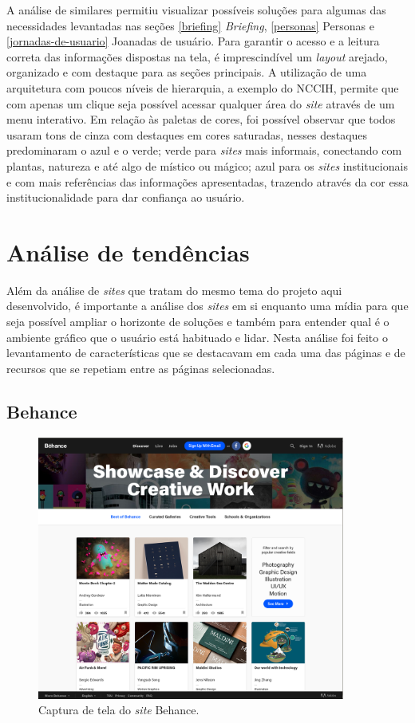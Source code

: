 A análise de similares permitiu visualizar possíveis soluções para algumas das necessidades levantadas nas seções \ref{briefing} \emph{Briefing}, \ref{personas} Personas e \ref{jornadas-de-usuario} Joanadas de usuário. Para garantir o acesso e a leitura correta das informações dispostas na tela, é imprescindível um \emph{layout} arejado, organizado e com destaque para as seções principais. A utilização de uma arquitetura com poucos níveis de hierarquia, a exemplo do NCCIH, permite que com apenas um clique seja possível acessar qualquer área do \emph{site} através de um menu interativo. Em relação às paletas de cores, foi possível observar que todos usaram tons de cinza com destaques em cores saturadas, nesses destaques predominaram o azul e o verde; verde para \emph{sites} mais informais, conectando com plantas, natureza e até algo de místico ou mágico; azul para os \emph{sites} institucionais e com mais referências das informações apresentadas, trazendo através da cor essa institucionalidade para dar confiança ao usuário.

\section{Análise de tendências}\label{analise-de-tendencias}

Além da análise de \emph{sites} que tratam do mesmo tema do projeto aqui desenvolvido, é importante a análise dos \emph{sites} em si enquanto uma mídia para que seja possível ampliar o horizonte de soluções e também para entender qual é o ambiente gráfico que o usuário está habituado e lidar. Nesta análise foi feito o levantamento de características que se destacavam em cada uma das páginas e de recursos que se repetiam entre as páginas selecionadas.

\subsection{Behance}\label{behance}

\begin{figure}[!htbp]
\centering
\caption{\label{fig-behance}Captura de tela do \emph{site} Behance.}
\includegraphics[width=0.9\textwidth]{images/tendencias/behance.png}
\end{figure}

